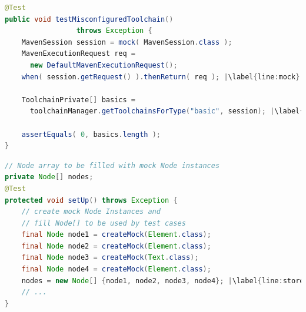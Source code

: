 
\begin{lstlisting}[basicstyle=\ttfamily, caption={This code snippet illustrates an example from maven-core, where calls to both the focal method \texttt{getToolchainsForType()} and to mocked \texttt{getRequest()} occur in test \textit{testMisconfiguredToolchain()}.},
basicstyle=\scriptsize\ttfamily,language = Java, framesep=4.5mm, escapechar=|,
framexleftmargin=1.0mm, captionpos=b, label=lis:mockCall]
@Test
public void testMisconfiguredToolchain()
                 throws Exception {
    MavenSession session = mock( MavenSession.class );
    MavenExecutionRequest req = 
      new DefaultMavenExecutionRequest();
    when( session.getRequest() ).thenReturn( req ); |\label{line:mock}|
    
    ToolchainPrivate[] basics =
      toolchainManager.getToolchainsForType("basic", session); |\label{line:real}|
    
    assertEquals( 0, basics.length );
}
\end{lstlisting}

\begin{lstlisting}[basicstyle=\ttfamily, caption={This example illustrates a field array container holding mock objects from \textit{setup()} in \texttt{NodeListIteratorTest.java}.},
basicstyle=\scriptsize\ttfamily,language = Java, framesep=4.5mm, framexleftmargin=1.0mm, captionpos=b, label=lis:container, escapechar=|]
// Node array to be filled with mock Node instances
private Node[] nodes;
@Test
protected void setUp() throws Exception {
    // create mock Node Instances and 
    // fill Node[] to be used by test cases
    final Node node1 = createMock(Element.class);
    final Node node2 = createMock(Element.class);
    final Node node3 = createMock(Text.class);
    final Node node4 = createMock(Element.class);
    nodes = new Node[] {node1, node2, node3, node4}; |\label{line:storeMocksInArray}|
    // ...
}
\end{lstlisting}


